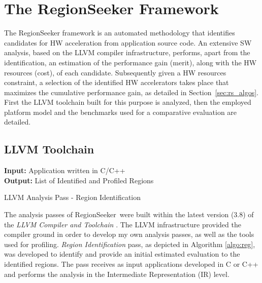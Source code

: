 \documentclass[]{usiinfthesis}
\newcommand{\rseeker}{{RegionSeeker}}
\begin{document}
\section{The RegionSeeker Framework}
\label{sec:rs}

The RegionSeeker framework is an automated methodology that 
identifies candidates for HW acceleration from application source 
code. An extensive SW analysis, based on the LLVM compiler infrastructure,
performs, apart from
the identification, an estimation of the performance gain (merit), along with
the HW resources (cost), of each candidate. Subsequently given a HW resources
constraint, a selection of the identified HW accelerators takes place that
maximizes the cumulative performance gain, as detailed in Section~\ref{sec:rs_algos}.
First the LLVM toolchain built for this purpose is analyzed, then the employed 
platform model and the benchmarks used for a comparative evaluation are detailed.

\subsection{LLVM Toolchain}

\begin{algorithm}[t]
\begin{flushleft}
\textbf{Input:}  Application written in C/C++\\
\textbf{Output:} List of Identified and Profiled Regions\\
\end{flushleft}
\begin{algorithmic}[1]
\State{}
\State{}
      \State{}
    \EndIf
  \EndFor

\EndFunction
\State
{}
    \State{}
  \EndFor
\EndFunction
\end{algorithmic}
\caption{LLVM Analysis Pass - Region Identification} 
\label{algo:reg}
\end{algorithm}

The analysis passes of \rseeker\ were built within the latest version (3.8) of the \emph{LLVM
  Compiler and Toolchain} \cite{LattnerMar04}. The LLVM infrastructure
provided the compiler ground in order to develop my own analysis
passes, as well as the tools used for profiling. 
\emph{Region Identification} pass, as depicted in Algorithm \ref{algo:reg}, 
was developed to identify and provide an initial estimated evaluation to 
the identified regions. The pass receives as input applications developed
in C or C++ and performs the analysis in the Intermediate Representation
(IR) level. \par
\end{document}
